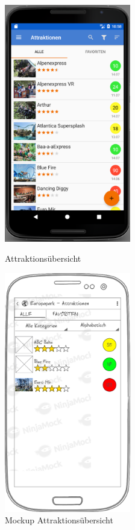 \begin{figure}[h]
    \centering
    \begin{minipage}{0.49\textwidth}
        \centering
        \includegraphics[width=0.49\textwidth, trim=150 200 200 200, 
        clip]{img/screenshots/ss_attraktionsuebersicht.png}
        \caption{Attraktionsübersicht}
		\label{figure:implementierungattraktionsuebersicht}
    \end{minipage}
    \begin{minipage}{0.49\textwidth}
        \centering
        \includegraphics[width=0.49\textwidth]{img/mockups/m_attraktionsuebersicht.png}
        \caption{Mockup Attraktionsübersicht}
    \end{minipage}
\end{figure}

